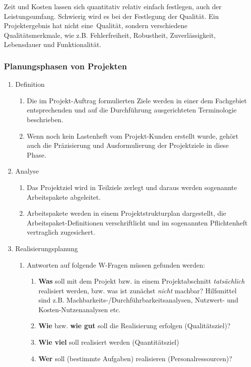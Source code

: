 Zeit und Kosten lassen sich quantitativ relativ einfach festlegen, auch der Leistungsumfang. Schwierig wird es bei der Festlegung der Qualität. Ein Projektergebnis hat nicht \ql eine\qr\ Qualität, sondern verschiedene Qualitätsmerkmale, wie z.B. Fehlerfreiheit, Robustheit, Zuverlässigkeit, Lebensdauer und Funktionalität.

\subsubsection{Planungsphasen von Projekten}
\begin{enumerate}
	\item Definition
	\begin{enumerate}
		\item Die im Projekt-Auftrag formulierten Ziele werden in einer dem Fachgebiet entsprechenden und auf die Durchführung ausgerichteten Terminologie beschrieben.
		\item Wenn noch kein Lastenheft vom Projekt-Kunden erstellt wurde, gehört auch die Präzisierung und Ausformulierung der Projektziele in diese Phase.
	\end{enumerate}
	\item Analyse
	\begin{enumerate}
		\item Das Projektziel wird in Teilziele zerlegt und daraus werden sogenannte Arbeitspakete abgeleitet.
		\item Arbeitspakete werden in einem Projektstrukturplan dargestellt, die Arbeitspaket-Definitionen verschriftlicht und im sogenannten Pflichtenheft vertraglich zugesichert.
	\end{enumerate}
	\item Realisierungsplanung
	\begin{enumerate}
		\item Antworten auf folgende W-Fragen müssen gefunden werden:
			\begin{enumerate}
				\item {\bf Was} soll mit dem Projekt bzw. in einem Projektabschnitt {\it tatsächlich} realisiert werden, bzw. was ist zunächst {\it nicht} machbar? Hilfsmittel sind z.B. Machbarkeits-/Durchführbarkeitsanalysen, Nutzwert- und Kosten-Nutzenanalysen etc.
				\item {\bf Wie} bzw. {\bf wie gut} soll die Realisierung erfolgen (Qualitätsziel)?
				\item {\bf Wie viel} soll realisiert werden (Quantitätsziel)
				\item {\bf Wer} soll (bestimmte Aufgaben) realisieren (Personalressourcen)?

\end{enumerate}
\end{enumerate}
\end{enumerate}
